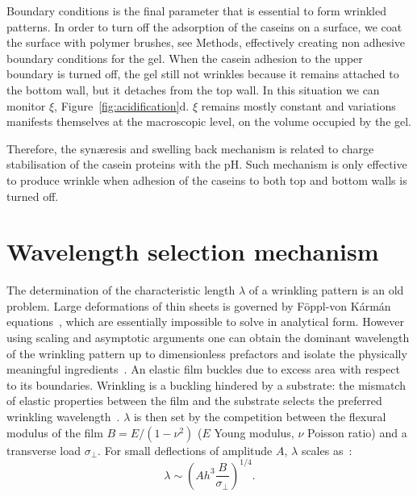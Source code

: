 \documentclass[twocolumn,superscriptaddress,showpacs,preprintnumbers,
amsmath,amssymb,prl]{revtex4-1}
\begin{document}
Boundary conditions is the final parameter that is essential to form wrinkled patterns. In order to turn off the adsorption of the caseins on a surface, we coat the surface with polymer brushes, see Methods, effectively creating non adhesive boundary conditions for the gel. When the casein adhesion to the upper boundary is turned off, the gel still not wrinkles because it remains attached to the bottom wall, but it detaches from the top wall. In this situation we can monitor $\xi$, Figure~\ref{fig:acidification}d. $\xi$ remains mostly constant and variations manifests themselves at the macroscopic level, on the volume occupied by the gel.

Therefore, the syn\ae{}resis and swelling back mechanism is related to charge stabilisation of the casein proteins with the pH. Such mechanism is only effective to produce wrinkle when adhesion of the caseins to both top and bottom walls is turned off.







\section*{Wavelength selection mechanism}


The determination of the characteristic length $\lambda$ of a wrinkling pattern is an old problem. Large deformations of thin sheets is governed by F\"{o}ppl-von K\'arm\'an equations~\cite{landau1986}, which are essentially impossible to solve in analytical form. However using scaling and asymptotic arguments one can obtain the dominant wavelength of the wrinkling pattern up to dimensionless prefactors and isolate the physically meaningful ingredients~\cite{Cerda2003}. An elastic film buckles due to excess area with respect to its boundaries. Wrinkling is a buckling hindered by a substrate: the mismatch of elastic properties between the film and the substrate selects the preferred wrinkling wavelength~\cite{Gough1940, Bijlaard1946}. $\lambda$ is then set by the competition between the flexural modulus of the film $B=E/(1-\nu^2)$ ($E$ Young modulus, $\nu$ Poisson ratio) and a transverse load $\sigma_\perp$. For small deflections of  amplitude $A$, $\lambda$ scales as~\cite{Vella2009,Kolinski2009}: 
%
\begin{equation}
\lambda \sim \left( A h^3 \frac{B}{\sigma_{\perp}} \right)^{1/4}.
\label{eq:lstar}
\end{equation}
\end{document}
